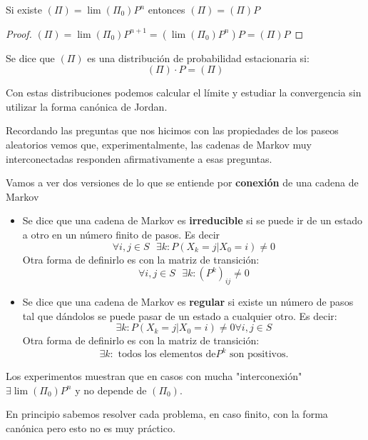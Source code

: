 \obs Si existe $\left(\Pi\right) = \lim \left(\Pi_0\right) P^n$ entonces $\left(\Pi\right) = \left(\Pi\right) P$
\begin{proof}
	$\left(\Pi\right) = \lim\left(\Pi_0\right) P^{n+1} = \left(\lim \left(\Pi_0\right)P^n\right)P = \left(\Pi\right) P$
\end{proof}

\begin{defn}
	Se dice que $\left(\Pi\right)$ es una distribución de probabilidad estacionaria si:
	$$\left(\Pi\right)\cdot P = \left(\Pi\right)$$
\end{defn}

\obs Con estas distribuciones podemos calcular el límite y estudiar la convergencia sin utilizar la forma canónica de Jordan.


Recordando las preguntas que nos hicimos con las propiedades de los paseos aleatorios vemos que, experimentalmente, las cadenas de Markov muy interconectadas responden afirmativamente a esas preguntas.

Vamos a ver dos versiones de lo que se entiende por \textbf{conexión} de una cadena de Markov

\begin{itemize}
	\item \begin{defn}
		Se dice que una cadena de Markov es \textbf{irreducible} si se puede ir de un estado a otro en un número finito de pasos. Es decir
		$$\forall i,j \in S\text{    }\exists k : P(X_k = j| X_0 = i) \neq 0$$
		Otra forma de definirlo es con la matriz de transición:
		$$\forall i,j \in S \text{    }\exists k: (P^k)_{ij} \neq 0$$
	\end{defn}
	\item \begin{defn}
		Se dice que una cadena de Markov es \textbf{regular} si existe un número de pasos tal que dándolos se puede pasar de un estado a cualquier otro. Es decir:
		$$ \exists k : P(X_k = j| X_0 = i) \neq 0  \forall i,j \in S $$
		Otra forma de definirlo es con la matriz de transición:
		$$\exists k : \text{ todos los elementos de} P^k \text{ son positivos.}$$
	\end{defn}
\end{itemize}


Los experimentos muestran que en casos con mucha "interconexión" $\exists \lim (\Pi_0)P^n$ y no depende de $(\Pi_0)$.

En principio sabemos resolver cada problema, en caso finito, con la forma canónica pero esto no es muy práctico.
\newpage
